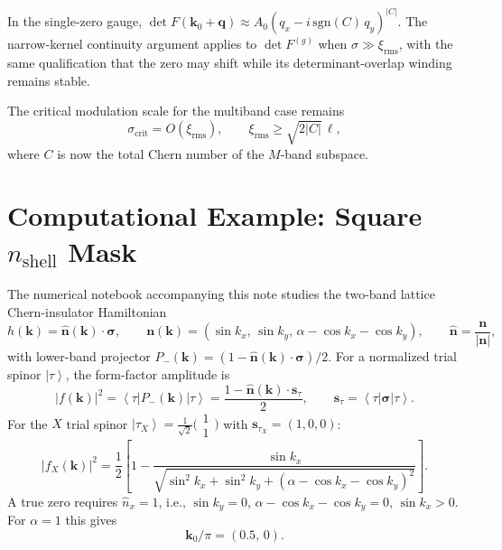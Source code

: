 \documentclass[aps,prb,onecolumn,nofootinbib,superscriptaddress]{revtex4-2}
\newcommand{\mbf}[1]{\mathbf{#1}}
\newcommand{\bs}[1]{\boldsymbol{#1}}
\newcommand{\ket}[1]{\left|#1\right\rangle}
\newcommand{\bra}[1]{\left\langle#1\right|}
\begin{document}
In the single-zero gauge, $\det F(\mbf{k}_0+\mbf{q}) \approx A_0(q_x-i\,\mathrm{sgn}(C)\,q_y)^{|C|}$. The narrow-kernel continuity argument applies to $\det F^{(g)}$ when $\sigma\gg\xi_{\mathrm{rms}}$, with the same qualification that the zero may shift while its determinant-overlap winding remains stable.

The critical modulation scale for the multiband case remains
\begin{equation}\label{eq:spread_multi}
\sigma_{\mathrm{crit}} = O(\xi_{\mathrm{rms}}), \qquad \xi_{\mathrm{rms}}\geq \sqrt{2|C|}\,\ell,
\end{equation}
where $C$ is now the total Chern number of the $M$-band subspace.

\section{Computational Example: Square \texorpdfstring{$n_{\mathrm{shell}}$}{n-shell} Mask}
\label{sec:numerical}

The numerical notebook accompanying this note studies the two-band lattice Chern-insulator Hamiltonian
\begin{equation}
h(\mbf{k}) = \hat{\mbf{n}}(\mbf{k})\cdot\bs{\sigma},
\qquad
\mbf{n}(\mbf{k}) = \left(\sin k_x,\,\sin k_y,\,\alpha-\cos k_x-\cos k_y\right),
\qquad
\hat{\mbf{n}}=\frac{\mbf{n}}{|\mbf{n}|},
\end{equation}
with lower-band projector $P_-(\mbf{k}) = (1-\hat{\mbf{n}}(\mbf{k})\cdot\bs{\sigma})/2$. For a normalized trial spinor $\ket{\tau}$, the form-factor amplitude is
\begin{equation}
|f(\mbf{k})|^2 = \bra{\tau}P_-(\mbf{k})\ket{\tau} = \frac{1-\hat{\mbf{n}}(\mbf{k})\cdot\mbf{s}_\tau}{2}, \qquad \mbf{s}_\tau=\bra{\tau}\bs{\sigma}\ket{\tau}.
\end{equation}
For the $X$ trial spinor $\ket{\tau_X}=\frac{1}{\sqrt{2}}\bigl(\begin{smallmatrix}1\\1\end{smallmatrix}\bigr)$ with $\mbf{s}_{\tau_X}=(1,0,0)$:
\begin{equation}
|f_X(\mbf{k})|^2 = \frac{1}{2}\left[1-\frac{\sin k_x}{\sqrt{\sin^2 k_x+\sin^2 k_y+(\alpha-\cos k_x-\cos k_y)^2}}\right].
\end{equation}
A true zero requires $\hat{n}_x=1$, i.e., $\sin k_y=0$, $\alpha-\cos k_x-\cos k_y=0$, $\sin k_x>0$. For $\alpha=1$ this gives
\begin{equation}
\mbf{k}_0/\pi = (0.5,\,0).
\end{equation}
\end{document}
